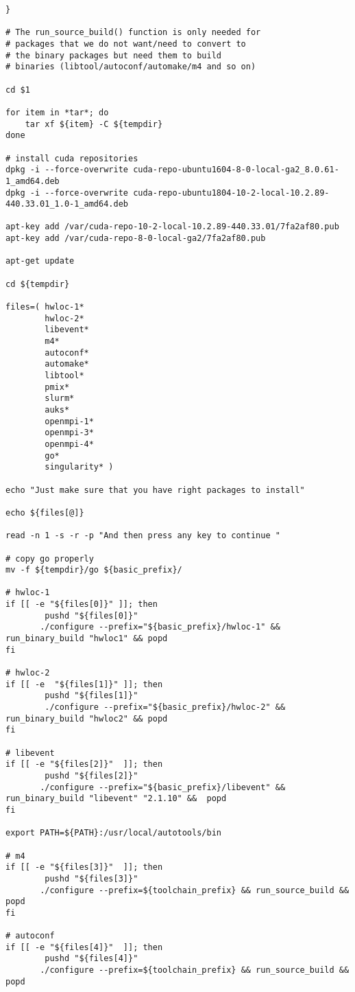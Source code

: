 \documentclass[a4paper]{extarticle}
\begin{document}
\begin{verbatim}
}

# The run_source_build() function is only needed for
# packages that we do not want/need to convert to
# the binary packages but need them to build
# binaries (libtool/autoconf/automake/m4 and so on)

cd $1

for item in *tar*; do
    tar xf ${item} -C ${tempdir}
done

# install cuda repositories
dpkg -i --force-overwrite cuda-repo-ubuntu1604-8-0-local-ga2_8.0.61-1_amd64.deb
dpkg -i --force-overwrite cuda-repo-ubuntu1804-10-2-local-10.2.89-440.33.01_1.0-1_amd64.deb

apt-key add /var/cuda-repo-10-2-local-10.2.89-440.33.01/7fa2af80.pub
apt-key add /var/cuda-repo-8-0-local-ga2/7fa2af80.pub

apt-get update

cd ${tempdir}

files=( hwloc-1*
        hwloc-2*
        libevent*
        m4*
        autoconf*
        automake*
        libtool*
        pmix*
        slurm*
        auks*
        openmpi-1*
        openmpi-3*
        openmpi-4*
        go*
        singularity* )

echo "Just make sure that you have right packages to install"

echo ${files[@]}

read -n 1 -s -r -p "And then press any key to continue "

# copy go properly
mv -f ${tempdir}/go ${basic_prefix}/

# hwloc-1
if [[ -e "${files[0]}" ]]; then
        pushd "${files[0]}"
       ./configure --prefix="${basic_prefix}/hwloc-1" && run_binary_build "hwloc1" && popd
fi

# hwloc-2
if [[ -e  "${files[1]}" ]]; then
        pushd "${files[1]}"
        ./configure --prefix="${basic_prefix}/hwloc-2" && run_binary_build "hwloc2" && popd
fi

# libevent
if [[ -e "${files[2]}"  ]]; then
        pushd "${files[2]}"
       ./configure --prefix="${basic_prefix}/libevent" && run_binary_build "libevent" "2.1.10" &&  popd
fi

export PATH=${PATH}:/usr/local/autotools/bin

# m4
if [[ -e "${files[3]}"  ]]; then
        pushd "${files[3]}"
       ./configure --prefix=${toolchain_prefix} && run_source_build && popd
fi

# autoconf
if [[ -e "${files[4]}"  ]]; then
        pushd "${files[4]}"
       ./configure --prefix=${toolchain_prefix} && run_source_build && popd


\end{verbatim}
\end{document}

